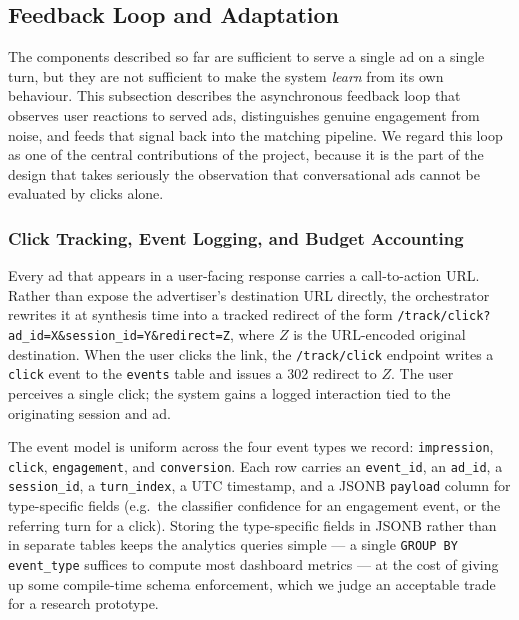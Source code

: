 \subsection{Feedback Loop and Adaptation}
\label{subsec:feedback-loop}

The components described so far are sufficient to serve a single ad on a
single turn, but they are not sufficient to make the system \emph{learn} from
its own behaviour. This subsection describes the asynchronous feedback loop
that observes user reactions to served ads, distinguishes genuine engagement
from noise, and feeds that signal back into the matching pipeline. We regard
this loop as one of the central contributions of the project, because it is
the part of the design that takes seriously the observation that
conversational ads cannot be evaluated by clicks alone.

\subsubsection{Click Tracking, Event Logging, and Budget Accounting}
\label{subsubsec:click-tracking}

Every ad that appears in a user-facing response carries a call-to-action URL.
Rather than expose the advertiser's destination URL directly, the orchestrator
rewrites it at synthesis time into a tracked redirect of the form
\texttt{/track/click?ad\_id=X\&session\_id=Y\&redirect=Z}, where $Z$ is the
URL-encoded original destination. When the user clicks the link, the
\texttt{/track/click} endpoint writes a \texttt{click} event to the
\texttt{events} table and issues a 302 redirect to $Z$. The user perceives a
single click; the system gains a logged interaction tied to the originating
session and ad.

The event model is uniform across the four event types we record:
\texttt{impression}, \texttt{click}, \texttt{engagement}, and
\texttt{conversion}. Each row carries an \texttt{event\_id}, an
\texttt{ad\_id}, a \texttt{session\_id}, a \texttt{turn\_index}, a UTC
timestamp, and a JSONB \texttt{payload} column for type-specific fields
(e.g.\ the classifier confidence for an engagement event, or the referring
turn for a click). Storing the type-specific fields in JSONB rather than in
separate tables keeps the analytics queries simple --- a single
\texttt{GROUP BY event\_type} suffices to compute most dashboard metrics ---
at the cost of giving up some compile-time schema enforcement, which we
judge an acceptable trade for a research prototype.

